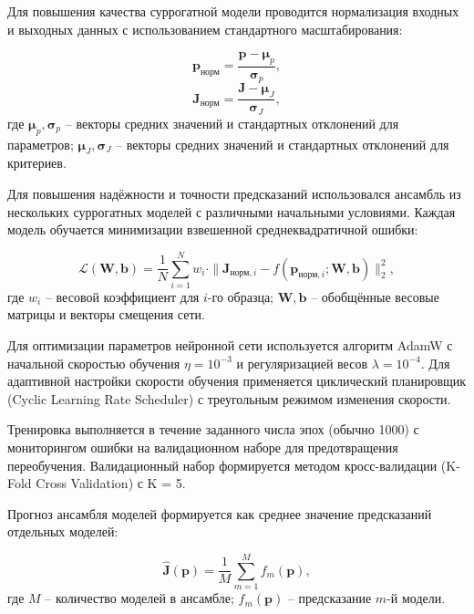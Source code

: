 Для повышения качества суррогатной модели проводится нормализация
входных и выходных данных с использованием стандартного масштабирования:

\begin{equation}
	\mathbf{p}_\text{норм} = \frac{\mathbf{p} - \boldsymbol{\mu}_p}{\boldsymbol{\sigma}_p},
\end{equation}
\begin{equation}
	\mathbf{J}_\text{норм} = \frac{\mathbf{J} - \boldsymbol{\mu}_J}{\boldsymbol{\sigma}_J},
\end{equation}
где $\boldsymbol{\mu}_p, \boldsymbol{\sigma}_p$ -- векторы средних значений и стандартных отклонений для параметров;
$\boldsymbol{\mu}_J, \boldsymbol{\sigma}_J$ -- векторы средних значений и стандартных отклонений для критериев.

Для повышения надёжности и точности предсказаний использовался ансамбль из нескольких суррогатных
моделей с различными начальными условиями. Каждая модель обучается минимизации взвешенной среднеквадратичной ошибки:

\begin{equation}
	\mathcal{L}(\mathbf{W}, \mathbf{b}) = \frac{1}{N} \sum_{i=1}^N w_i \cdot \|\mathbf{J}_{\text{норм},i} - f(\mathbf{p}_{\text{норм},i}; \mathbf{W}, \mathbf{b})\|_2^2,
\end{equation}
где $w_i$ -- весовой коэффициент для $i$-го образца;
$\mathbf{W}, \mathbf{b}$ -- обобщённые весовые матрицы и векторы смещения сети.

Для оптимизации параметров нейронной сети используется алгоритм AdamW с
начальной скоростью обучения $\eta = 10^{-3}$ и регуляризацией весов $\lambda = 10^{-4}$.
Для адаптивной настройки скорости обучения применяется циклический планировщик
(Cyclic Learning Rate Scheduler) с треугольным режимом изменения скорости.

Тренировка выполняется в течение заданного числа эпох (обычно 1000) с
мониторингом ошибки на валидационном наборе для предотвращения переобучения. Валидационный
набор формируется методом кросс-валидации (K-Fold Cross Validation) с K = 5.

Прогноз ансамбля моделей формируется как
среднее значение предсказаний отдельных моделей:

\begin{equation}
	\hat{\mathbf{J}}(\mathbf{p}) = \frac{1}{M} \sum_{m=1}^M f_m(\mathbf{p}),
\end{equation}
где $M$ -- количество моделей в ансамбле;
$f_m(\mathbf{p})$ -- предсказание $m$-й модели.

